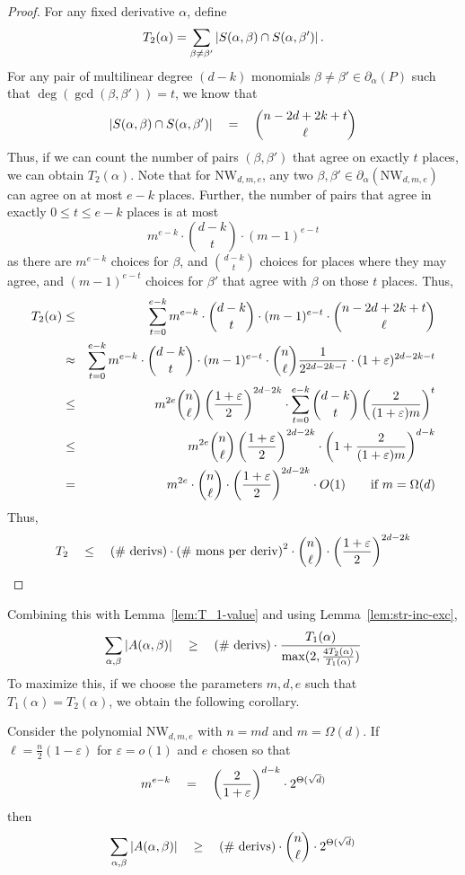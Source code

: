 \documentclass[12pt]{report}
\newcommand{\NW}{\mathrm{NW}}
\renewcommand{\epsilon}{\varepsilon}
\begin{document}
\begin{proof}
For any fixed derivative $\alpha$, define \[T_2(\alpha) = \sum_{\beta\neq \beta'}\left|S(\alpha, \beta)\cap S(\alpha, \beta')\right|.\] 
For any pair of multilinear degree $(d-k)$ monomials $\beta \neq \beta' \in \partial_\alpha(P)$ such that $\deg(\gcd(\beta, \beta')) = t$, we know that 
\[
\left|S(\alpha, \beta)\cap S(\alpha, \beta')\right| \quad = \quad \binom{n - 2d + 2k +t}{\ell}
\]
Thus, if we can count the number of pairs $(\beta, \beta')$ that agree on exactly $t$ places, we can obtain $T_2(\alpha)$. Note that for $\NW_{d,m,e}$, any two $\beta, \beta' \in\partial_\alpha(\NW_{d,m,e})$ can agree on at most $e-k$ places. Further, the number of pairs that agree in exactly $0\leq t\leq e-k$ places is at most
\[
m^{e-k} \cdot \binom{d-k}{t} \cdot (m-1)^{e-t}
\]
as there are $m^{e-k}$ choices for $\beta$, and $\binom{d-k}{t}$ choices for places where they may agree, and $(m-1)^{e-t}$ choices for $\beta'$ that agree with $\beta$ on those $t$ places. Thus,
\begin{eqnarray*}
T_2(\alpha) &\leq& \sum_{t=0}^{e-k} m^{e-k} \cdot \binom{d-k}{t} \cdot (m-1)^{e-t} \cdot  \binom{n - 2d + 2k +t}{\ell}\\
& \approx  & \sum_{t=0}^{e-k} m^{e-k} \cdot \binom{d-k}{t} \cdot (m-1)^{e-t} \cdot  \binom{n}{\ell} \frac{1}{2^{2d-2k -t}}\cdot (1+\epsilon)^{2d - 2k - t}\\
& \leq & m^{2e}\binom{n}{\ell}\inparen{\frac{1+\epsilon}{2}}^{2d -2k}\cdot\sum_{t=0}^{e-k}\binom{d-k}{t}\inparen{\frac{2}{(1+\epsilon)m}}^t\\
& \leq & m^{2e}\binom{n}{\ell}\inparen{\frac{1+\epsilon}{2}}^{2d -2k}\cdot \inparen{1+\frac{2}{(1+\epsilon)m}}^{d-k}\\
& = & m^{2e}\cdot \binom{n}{\ell} \cdot \inparen{\frac{1+\epsilon}{2}}^{2d -2k}\cdot O(1) \qquad\text{if $m = \Omega(d)$}
\end{eqnarray*}
Thus,
\[
T_2 \quad \leq \quad\text{(\# derivs)} \cdot \text{(\# mons per deriv)}^2\cdot \binom{n}{\ell} \cdot \inparen{\frac{1+\epsilon}{2}}^{2d -2k}
\]
\end{proof}
Combining this with Lemma~\ref{lem:T_1-value} and using Lemma~\ref{lem:str-inc-exc},
\[
\sum_{\alpha,\beta}\left|A(\alpha, \beta)\right| \quad \geq \quad \text{(\# derivs)}\cdot \frac{T_1(\alpha)}{\max(2, \frac{4T_2(\alpha)}{T_1(\alpha)})}
\]
To maximize this, if we choose the parameters $m,d,e$ such that $T_1(\alpha) = T_2(\alpha)$, we obtain the following corollary. 
\begin{corollary}\label{cor:T2-bound}
Consider the polynomial $\NW_{d,m,e}$ with $n = md$ and $m = \Omega(d)$. If $\ell = \frac{n}{2}(1 - \epsilon)$ for $\epsilon = o(1)$ and $e$ chosen so that
\[
m^{e-k} \quad = \quad \inparen{\frac{2}{1+\epsilon}}^{d-k} \cdot 2^{\Theta(\sqrt{d})}
\]
then
\[
\sum_{\alpha, \beta}\left|A(\alpha, \beta)\right| \quad \geq \quad \text{(\# derivs)}\cdot  \binom{n}{\ell} \cdot 2^{\Theta(\sqrt{d})}
\]
\end{corollary}
\end{document}
